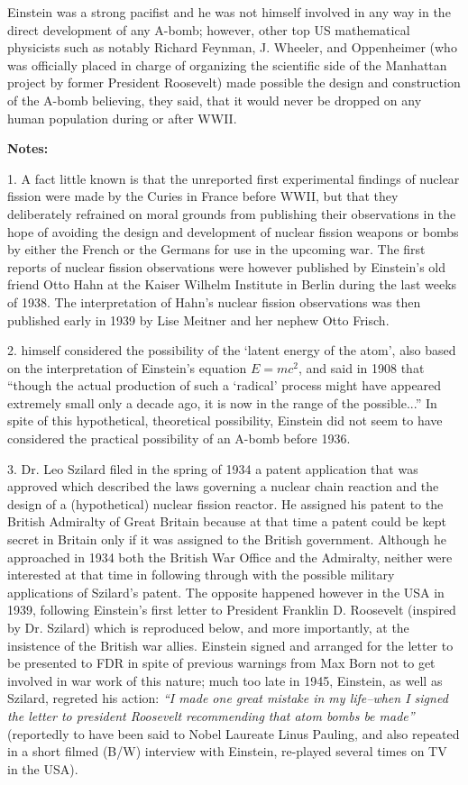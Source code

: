 \documentclass[12pt]{article}
\begin{document}
 Einstein was a strong pacifist and he was not himself involved in any way in the direct development of any A-bomb; however, other top US mathematical physicists such as notably Richard Feynman, J. Wheeler, and Oppenheimer (who was officially placed in charge of organizing the scientific side of the Manhattan project by former President Roosevelt) made possible the design and construction of the A-bomb believing, they said, that it would never be dropped on any human population during or after WWII. 

\textbf{Notes:}

1. A fact little known is that the unreported first experimental findings of nuclear fission were made by the Curies in France before WWII, but that they deliberately refrained on moral grounds from publishing their observations in the hope of avoiding the design and development of nuclear fission weapons or bombs by either the French or the Germans for use in the upcoming war. The first reports of nuclear fission observations were however published by Einstein's old friend Otto Hahn at the Kaiser Wilhelm Institute in Berlin during the last weeks of 1938. The interpretation of Hahn's nuclear fission observations was then published early in 1939 by Lise Meitner and her nephew Otto Frisch.

2.  himself considered the possibility of the `latent energy of the atom', also based on
the interpretation of Einstein's equation $E = mc^2$, and said in 1908 that ``though the actual production of such a
`radical' process might have appeared extremely small only a decade ago, it is now in the range of the possible...''
In spite of this hypothetical, theoretical possibility, Einstein did not seem to have considered the practical possibility of an A-bomb before 1936. 

3. Dr. Leo Szilard filed in the spring of 1934 a patent application that was approved which described the laws
governing a nuclear chain reaction and the design of a (hypothetical) nuclear fission reactor. He assigned his patent
to the British Admiralty of Great Britain because at that time a patent could be kept secret in Britain only if it was assigned to the British government. Although he approached in 1934 both the British War Office and the Admiralty, neither were interested at that time in following through with the possible military applications of Szilard's patent. The opposite happened however in the USA in 1939, following Einstein's first letter to President Franklin D. Roosevelt (inspired by Dr. Szilard) which is reproduced below, and more importantly, at the insistence of the British war allies. Einstein signed and arranged for the letter to be presented to FDR in spite of previous warnings from Max Born not to get involved in war work of this nature; much too late in 1945, Einstein, as well as Szilard, regreted his action: \emph{``I made one great mistake in my life--when I signed the letter to president Roosevelt recommending that atom bombs be made''} (reportedly to have been said to Nobel Laureate Linus Pauling, and also repeated in a short filmed (B/W) interview with Einstein, re-played several times on TV in the USA). 
\end{document}
